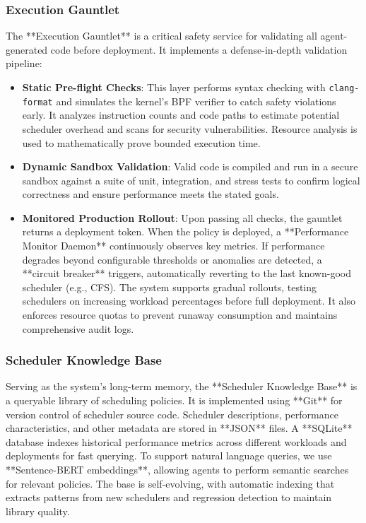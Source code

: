 \subsubsection{Execution Gauntlet}
The **Execution Gauntlet** is a critical safety service for validating all agent-generated code before deployment. It implements a defense-in-depth validation pipeline:
\begin{itemize}
    \item \textbf{Static Pre-flight Checks}: This layer performs syntax checking with \texttt{clang-format} and simulates the kernel's BPF verifier to catch safety violations early. It analyzes instruction counts and code paths to estimate potential scheduler overhead and scans for security vulnerabilities. Resource analysis is used to mathematically prove bounded execution time.
    \item \textbf{Dynamic Sandbox Validation}: Valid code is compiled and run in a secure sandbox against a suite of unit, integration, and stress tests to confirm logical correctness and ensure performance meets the stated goals.

    \item \textbf{Monitored Production Rollout}: Upon passing all checks, the gauntlet returns a deployment token. When the policy is deployed, a **Performance Monitor Daemon** continuously observes key metrics. If performance degrades beyond configurable thresholds or anomalies are detected, a **circuit breaker** triggers, automatically reverting to the last known-good scheduler (e.g., CFS). The system supports gradual rollouts, testing schedulers on increasing workload percentages before full deployment. It also enforces resource quotas to prevent runaway consumption and maintains comprehensive audit logs.
\end{itemize}

\subsubsection{Scheduler Knowledge Base}
Serving as the system's long-term memory, the **Scheduler Knowledge Base** is a queryable library of scheduling policies. It is implemented using **Git** for version control of scheduler source code. Scheduler descriptions, performance characteristics, and other metadata are stored in **JSON** files. A **SQLite** database indexes historical performance metrics across different workloads and deployments for fast querying. To support natural language queries, we use **Sentence-BERT embeddings**, allowing agents to perform semantic searches for relevant policies. The base is self-evolving, with automatic indexing that extracts patterns from new schedulers and regression detection to maintain library quality.

